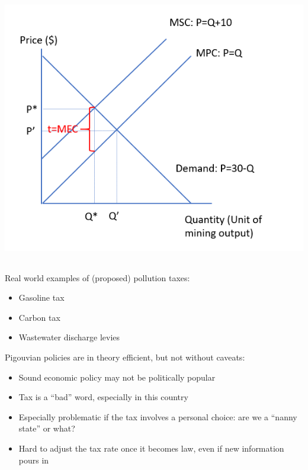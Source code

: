 \begin{frame}{}
\protect\hypertarget{section-7}{}

\includegraphics[width=\textwidth,height=4.6875in]{figures/m4_mining_tax.png}

\end{frame}

\begin{frame}{Real world examples of (proposed) pollution taxes:}
\protect\hypertarget{real-world-examples-of-proposed-pollution-taxes}{}

\begin{itemize}
\tightlist
\item
  Gasoline tax
\item
  Carbon tax
\item
  Wastewater discharge levies
\end{itemize}

\end{frame}

\begin{frame}{}
\protect\hypertarget{section-8}{}

Pigouvian policies are in theory efficient, but not without caveats:

\begin{itemize}
\tightlist
\item
  Sound economic policy may not be politically popular
\item
  Tax is a ``bad'' word, especially in this country
\item
  Especially problematic if the tax involves a personal choice: are we a
  ``nanny state'' or what?
\item
  Hard to adjust the tax rate once it becomes law, even if new
  information pours in
\end{itemize}

\end{frame}

